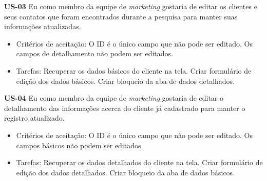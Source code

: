 \textbf{US-03} Eu como membro da equipe de \textit{marketing} gostaria de editar os clientes e seus contatos que foram encontrados durante a pesquisa para manter suas informações atualizadas.

\begin{itemize}
  \item Critérios de aceitação:
\subitem O ID é o único campo que não pode ser editado.
\subitem Os campos de detalhamento não podem ser editados.
 
\end{itemize}

\begin{itemize}
  \item Tarefas:
  \subitem Recuperar os dados básicos do cliente na tela.
  \subitem Criar formulário de edição dos dados básicos.
  \subitem Criar bloqueio da aba de dados detalhados.
\end{itemize}


\textbf{US-04} Eu como membro da equipe de \textit{marketing} gostaria de editar o detalhamento das informações acerca do cliente já cadastrado para manter o registro atualizado.
\begin{itemize}
\item Critérios de aceitação:
\subitem O ID é o único campo que não pode ser editado.
\subitem Os campos básicos não podem ser editados.

\end{itemize}

\begin{itemize}
  \item Tarefas:
  \subitem Recuperar os dados detalhados do cliente na tela.
  \subitem Criar formulário de edição dos dados detalhados.
  \subitem Criar bloqueio da aba de dados básicos.
\end{itemize}


